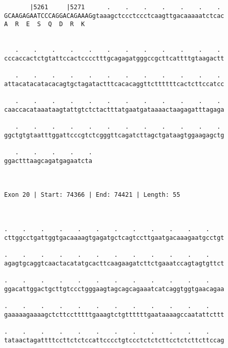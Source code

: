 \documentclass{article}
\begin{document}
\begin{Verbatim}
       |5261     |5271      .    .    .    .    .    .    . 
GCAAGAGAATCCCAGGACAGAAAGgtaaagctccctccctcaagttgacaaaaatctcac
A  R  E  S  Q  D  R  K                                      
                                                            
  
   .    .    .    .    .    .    .    .    .    .    .    . 
cccaccactctgtattccactcccctttgcagagatgggccgcttcattttgtaagactt
                                                            
   .    .    .    .    .    .    .    .    .    .    .    . 
attacatacatacacagtgctagatactttcacacaggttcttttttcactcttccatcc
                                                            
   .    .    .    .    .    .    .    .    .    .    .    . 
caaccacataaataagtattgtctctactttatgaatgataaaactaagagatttagaga
                                                            
   .    .    .    .    .    .    .    .    .    .    .    . 
ggctgtgtaatttggattcccgtctcgggttcagatcttagctgataagtggaagagctg
                                                            
   .    .    .    .    .
ggactttaagcagatgagaatcta
                        
                        
 
Exon 20 | Start: 74366 | End: 74421 | Length: 55



.    .    .    .    .    .    .    .    .    .    .    .    
cttggcctgattggtgacaaaagtgagatgctcagtccttgaatgacaaagaatgcctgt
                                                            
.    .    .    .    .    .    .    .    .    .    .    .    
agagtgcaggtcaactacatatgcacttcaagaagatcttctgaaatccagtagtgttct
                                                            
.    .    .    .    .    .    .    .    .    .    .    .    
ggacattggactgcttgtccctgggaagtagcagcagaaatcatcaggtggtgaacagaa
                                                            
.    .    .    .    .    .    .    .    .    .    .    .    
gaaaaagaaaagctcttcctttttgaaagtctgttttttgaataaaagccaatattcttt
                                                            
.    .    .    .    .    .    .    .    .    .    .    .    
tataactagattttccttctctccattcccctgtccctctctcttcctctcttcttccag
                                                            

\end{Verbatim}
\end{document}
